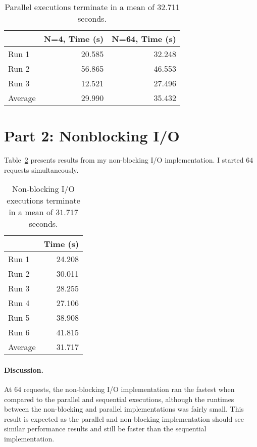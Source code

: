 \documentclass[12pt]{article}
\begin{document}
\begin{table}[H]
  \centering
  \begin{tabular}{lrr}
    & {\bf N=4, Time (s)} & {\bf N=64, Time (s)} \\
    \hline
    Run 1 & 20.585 & 32.248 \\
    Run 2 & 56.865 & 46.553 \\
    Run 3 & 12.521 & 27.496 \\
    \hline
    Average & 29.990 & 35.432 \\
  \end{tabular}
  \caption{\label{tbl_parallel}Parallel executions terminate in a mean of 32.711 seconds.}
\end{table}

\section*{Part 2: Nonblocking I/O}

Table~\ref{tbl_nbio} presents results from my non-blocking I/O implementation. I started $64$ requests
simultaneously.

\begin{table}[H]
  \centering
  \begin{tabular}{lr}
    & {\bf Time (s)} \\
    \hline
    Run 1 & 24.208 \\
    Run 2 & 30.011 \\
    Run 3 & 28.255 \\
    Run 4 & 27.106 \\
    Run 5 & 38.908 \\
    Run 6 & 41.815 \\
    \hline
    Average & 31.717 \\
  \end{tabular}
  \caption{\label{tbl_nbio}Non-blocking I/O executions terminate in a mean of $31.717$ seconds.}
\end{table}

\paragraph{Discussion.} At 64 requests, the non-blocking I/O implementation ran the fastest when compared to the parallel and sequential executions, although the runtimes between the non-blocking and parallel implementations was fairly small. This result is expected as the parallel and non-blocking implementation should see similar performance results and still be faster than the sequential implementation. 
\end{document}
